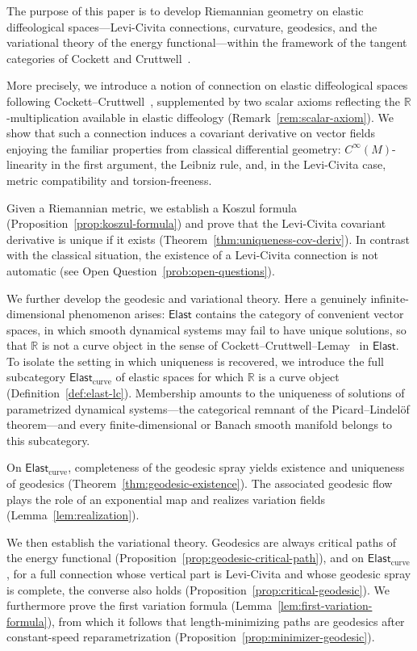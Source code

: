 \documentclass{amsart}
\newcommand{\R}{\mathbb{R}}
\theoremstyle{definition}
\begin{document}
The purpose of this paper is to develop Riemannian geometry on elastic diffeological spaces---Levi-Civita connections, curvature, geodesics, and the variational theory of the energy functional---within the framework of the tangent categories of Cockett and Cruttwell~\cite{CC14,CC17}.

More precisely, we introduce a notion of connection on elastic diffeological spaces following Cockett--Cruttwell~\cite{CC17}, supplemented by two scalar axioms reflecting the $\R$-multiplication available in elastic diffeology (Remark~\ref{rem:scalar-axiom}). We show that such a connection induces a covariant derivative on vector fields enjoying the familiar properties from classical differential geometry: $C^\infty(M)$-linearity in the first argument, the Leibniz rule, and, in the Levi-Civita case, metric compatibility and torsion-freeness.

Given a Riemannian metric, we establish a Koszul formula (Proposition~\ref{prop:koszul-formula}) and prove that the Levi-Civita covariant derivative is unique if it exists (Theorem~\ref{thm:uniqueness-cov-deriv}). In contrast with the classical situation, the existence of a Levi-Civita connection is not automatic (see Open Question~\ref{prob:open-questions}).


We further develop the geodesic and variational theory. Here a genuinely infinite-dimensional phenomenon arises: $\mathsf{Elast}$ contains the category of convenient vector spaces, in which smooth dynamical systems may fail to have unique solutions, so that $\R$ is not a curve object in the sense of Cockett--Cruttwell--Lemay~\cite{CCL} in $\mathsf{Elast}$. To isolate the setting in which uniqueness is recovered, we introduce the full subcategory $\mathsf{Elast}_{\mathrm{curve}}$ of elastic spaces for which $\R$ is a curve object (Definition~\ref{def:elast-lc}). Membership amounts to the uniqueness of solutions of parametrized dynamical systems---the categorical remnant of the Picard--Lindel\"of theorem---and every finite-dimensional or Banach smooth manifold belongs to this subcategory.

On $\mathsf{Elast}_{\mathrm{curve}}$, completeness of the geodesic spray yields existence and uniqueness of geodesics (Theorem~\ref{thm:geodesic-existence}). The associated geodesic flow plays the role of an exponential map and realizes variation fields (Lemma~\ref{lem:realization}).

We then establish the variational theory. Geodesics are always critical paths of the energy functional (Proposition~\ref{prop:geodesic-critical-path}), and on $\mathsf{Elast}_{\mathrm{curve}}$, for a full connection whose vertical part is Levi-Civita and whose geodesic spray is complete, the converse also holds (Proposition~\ref{prop:critical-geodesic}). We furthermore prove the first variation formula (Lemma~\ref{lem:first-variation-formula}), from which it follows that length-minimizing paths are geodesics after constant-speed reparametrization (Proposition~\ref{prop:minimizer-geodesic}).
\end{document}
